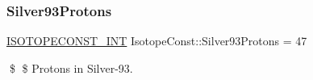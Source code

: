 \subsubsection{\texorpdfstring{Silver93\+Protons}{Silver93Protons}}
{\footnotesize\ttfamily \mbox{\hyperlink{group___isotope_const-_macros_ga5f18360b3e99483a35c32d789e62621c}{I\+S\+O\+T\+O\+P\+E\+C\+O\+N\+S\+T\+\_\+\+I\+NT}} Isotope\+Const\+::\+Silver93\+Protons = 47}

\$ \$ Protons in Silver-\/93. 